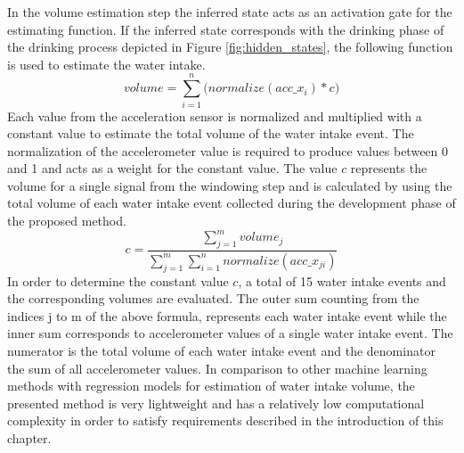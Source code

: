 In the volume estimation step the inferred state acts as an activation gate for the estimating function. If the inferred state corresponds with the drinking phase of the drinking process depicted in Figure \ref{fig:hidden_states}, the following function is used to estimate the water intake.
\begin{equation}
volume = \sum\limits_{i=1}^n \bigg(normalize(acc\_x_i) * c \bigg)
\end{equation}
Each value from the acceleration sensor is normalized and multiplied with a constant value to estimate the total volume of the water intake event. The normalization of the accelerometer value is required to produce values between 0 and 1 and acts as a weight for the constant value. The value $c$ represents the volume for a single signal from the windowing step and is calculated by using the total volume of each water intake event collected during the development phase of the proposed method.
\begin{equation}
c = \frac{\sum\limits_{j=1}^{m}volume_j}{\sum\limits_{j=1}^{m}\sum\limits_{i=1}^n normalize(acc\_x_{ji})}
\end{equation}
In order to determine the constant value $c$, a total of 15 water intake events and the corresponding volumes are evaluated. The outer sum counting from the indices j to m of the above formula, represents each water intake event while the inner sum corresponds to accelerometer values of a single water intake event. The numerator is the total volume of each water intake event and the denominator the sum of all accelerometer values. In comparison to other machine learning methods with regression models for estimation of water intake volume, the presented method is very lightweight and has a relatively low computational complexity in order to satisfy requirements described in the introduction of this chapter.
